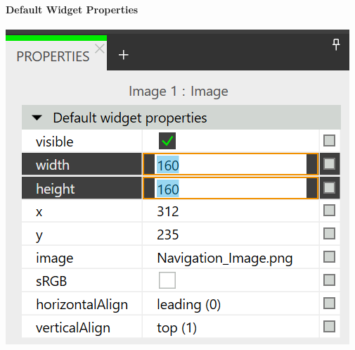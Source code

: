 \paragraph{Default Widget Properties}

\begin{center}
  \includegraphics[scale=0.4]{figures/DefaultProperties_Adaption.png}
  \label{fig:DefaultProperties_Adaption}
\end{center}
